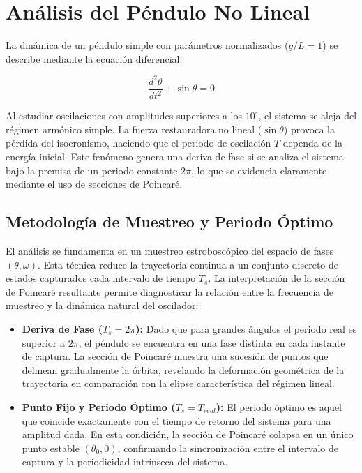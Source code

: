 \section{Análisis del Péndulo No Lineal}

La dinámica de un péndulo simple con parámetros normalizados ($g/L = 1$) se describe mediante la ecuación diferencial:

\begin{equation}
    \frac{d^2\theta}{dt^2} + \sin\theta = 0
\end{equation}

Al estudiar oscilaciones con amplitudes superiores a los $10^\circ$, el sistema se aleja del régimen armónico simple. La fuerza restauradora no lineal ($\sin\theta$) provoca la pérdida del isocronismo, haciendo que el periodo de oscilación $T$ dependa de la energía inicial. Este fenómeno genera una deriva de fase si se analiza el sistema bajo la premisa de un periodo constante $2\pi$, lo que se evidencia claramente mediante el uso de secciones de Poincaré.

\subsection{Metodología de Muestreo y Periodo Óptimo}

El análisis se fundamenta en un muestreo estroboscópico del espacio de fases $(\theta, \omega)$. Esta técnica reduce la trayectoria continua a un conjunto discreto de estados capturados cada intervalo de tiempo $T_s$. La interpretación de la sección de Poincaré resultante permite diagnosticar la relación entre la frecuencia de muestreo y la dinámica natural del oscilador:

\begin{itemize}
    \item \textbf{Deriva de Fase ($T_s = 2\pi$):} Dado que para grandes ángulos el periodo real es superior a $2\pi$, el péndulo se encuentra en una fase distinta en cada instante de captura. La sección de Poincaré muestra una sucesión de puntos que delinean gradualmente la órbita, revelando la deformación geométrica de la trayectoria en comparación con la elipse característica del régimen lineal.
    \item \textbf{Punto Fijo y Periodo Óptimo ($T_s = T_{real}$):} El periodo óptimo es aquel que coincide exactamente con el tiempo de retorno del sistema para una amplitud dada. En esta condición, la sección de Poincaré colapsa en un único punto estable $(\theta_0, 0)$, confirmando la sincronización entre el intervalo de captura y la periodicidad intrínseca del sistema.
\end{itemize}

